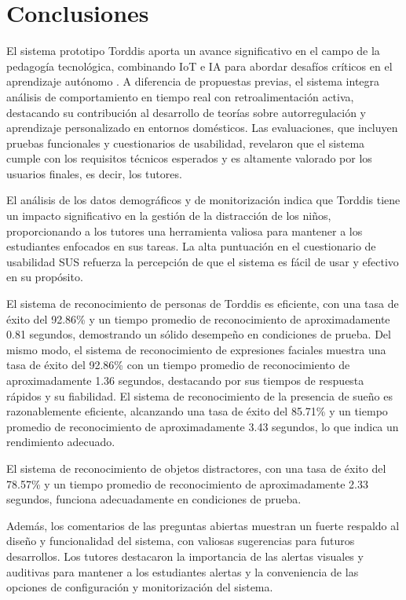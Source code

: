 \documentclass[a4paper,fleqn]{cas-sc}
\begin{document}
	\section{Conclusiones}
	\label{seccion:Seis}
		El sistema prototipo Torddis aporta un avance significativo en el campo de la pedagogía tecnológica, combinando IoT e IA para abordar desafíos críticos en el aprendizaje autónomo \cite{DiPietro2025Meta}. A diferencia de propuestas previas, el sistema integra análisis de comportamiento en tiempo real con retroalimentación activa, destacando su contribución al desarrollo de teorías sobre autorregulación y aprendizaje personalizado en entornos domésticos. Las evaluaciones, que incluyen pruebas funcionales y cuestionarios de usabilidad, revelaron que el sistema cumple con los requisitos técnicos esperados y es altamente valorado por los usuarios finales, es decir, los tutores.
		
		El análisis de los datos demográficos y de monitorización indica que Torddis tiene un impacto significativo en la gestión de la distracción de los niños, proporcionando a los tutores una herramienta valiosa para mantener a los estudiantes enfocados en sus tareas. La alta puntuación en el cuestionario de usabilidad SUS refuerza la percepción de que el sistema es fácil de usar y efectivo en su propósito.
		
		El sistema de reconocimiento de personas de Torddis es eficiente, con una tasa de éxito del 92.86\% y un tiempo promedio de reconocimiento de aproximadamente 0.81 segundos, demostrando un sólido desempeño en condiciones de prueba. Del mismo modo, el sistema de reconocimiento de expresiones faciales muestra una tasa de éxito del 92.86\% con un tiempo promedio de reconocimiento de aproximadamente 1.36 segundos, destacando por sus tiempos de respuesta rápidos y su fiabilidad. El sistema de reconocimiento de la presencia de sueño es razonablemente eficiente, alcanzando una tasa de éxito del 85.71\% y un tiempo promedio de reconocimiento de aproximadamente 3.43 segundos, lo que indica un rendimiento adecuado.
		
		El sistema de reconocimiento de objetos distractores, con una tasa de éxito del 78.57\% y un tiempo promedio de reconocimiento de aproximadamente 2.33 segundos, funciona adecuadamente en condiciones de prueba.
		
		Además, los comentarios de las preguntas abiertas muestran un fuerte respaldo al diseño y funcionalidad del sistema, con valiosas sugerencias para futuros desarrollos. Los tutores destacaron la importancia de las alertas visuales y auditivas para mantener a los estudiantes alertas y la conveniencia de las opciones de configuración y monitorización del sistema.
		
\end{document}
